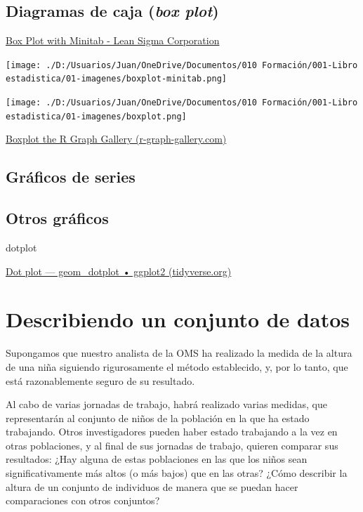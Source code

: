 \documentclass[
  letterpaper,
]{scrbook}
\begin{document}
\hypertarget{diagramas-de-caja-box-plot}{%
\subsection{\texorpdfstring{Diagramas de caja (\emph{box
plot})}{Diagramas de caja (box plot)}}\label{diagramas-de-caja-box-plot}}

\href{https://www.leansigmacorporation.com/box-plot-with-minitab/}{Box
Plot with Minitab - Lean Sigma Corporation}

\texttt{[image: ./D:/Usuarios/Juan/OneDrive/Documentos/010 Formación/001-Libro estadistica/01-imagenes/boxplot-minitab.png]}

\texttt{[image: ./D:/Usuarios/Juan/OneDrive/Documentos/010 Formación/001-Libro estadistica/01-imagenes/boxplot.png]}

\href{http://r-graph-gallery.com/boxplot.html}{Boxplot \textbar{} the R
Graph Gallery (r-graph-gallery.com)}

\hypertarget{gruxe1ficos-de-series}{%
\subsection{Gráficos de series}\label{gruxe1ficos-de-series}}

\hypertarget{otros-gruxe1ficos}{%
\subsection{Otros gráficos}\label{otros-gruxe1ficos}}

dotplot

\href{https://ggplot2.tidyverse.org/reference/geom_dotplot.html}{Dot
plot --- geom\_dotplot • ggplot2 (tidyverse.org)}

\hypertarget{describiendo-un-conjunto-de-datos}{%
\section{Describiendo un conjunto de
datos}\label{describiendo-un-conjunto-de-datos}}

Supongamos que nuestro analista de la OMS ha realizado la medida de la
altura de una niña siguiendo rigurosamente el método establecido, y, por
lo tanto, que está razonablemente seguro de su resultado.

Al cabo de varias jornadas de trabajo, habrá realizado varias medidas,
que representarán al conjunto de niños de la población en la que ha
estado trabajando. Otros investigadores pueden haber estado trabajando a
la vez en otras poblaciones, y al final de sus jornadas de trabajo,
quieren comparar sus resultados: ¿Hay alguna de estas poblaciones en las
que los niños sean significativamente más altos (o más bajos) que en las
otras? ¿Cómo describir la altura de un conjunto de individuos de manera
que se puedan hacer comparaciones con otros conjuntos?
\end{document}
